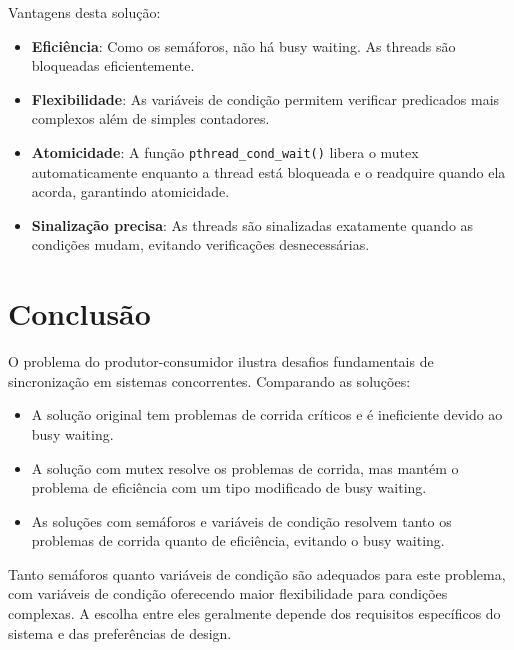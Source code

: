 \documentclass[12pt]{article}
\begin{document}
Vantagens desta solução:
\begin{itemize}
    \item \textbf{Eficiência}: Como os semáforos, não há busy waiting. As threads são bloqueadas eficientemente.
    \item \textbf{Flexibilidade}: As variáveis de condição permitem verificar predicados mais complexos além de simples contadores.
    \item \textbf{Atomicidade}: A função \texttt{pthread\_cond\_wait()} libera o mutex automaticamente enquanto a thread está bloqueada e o readquire quando ela acorda, garantindo atomicidade.
    \item \textbf{Sinalização precisa}: As threads são sinalizadas exatamente quando as condições mudam, evitando verificações desnecessárias.
\end{itemize}

\section{Conclusão}

O problema do produtor-consumidor ilustra desafios fundamentais de sincronização em sistemas concorrentes. Comparando as soluções:

\begin{itemize}
    \item A solução original tem problemas de corrida críticos e é ineficiente devido ao busy waiting.
    \item A solução com mutex resolve os problemas de corrida, mas mantém o problema de eficiência com um tipo modificado de busy waiting.
    \item As soluções com semáforos e variáveis de condição resolvem tanto os problemas de corrida quanto de eficiência, evitando o busy waiting.
\end{itemize}

Tanto semáforos quanto variáveis de condição são adequados para este problema, com variáveis de condição oferecendo maior flexibilidade para condições complexas. A escolha entre eles geralmente depende dos requisitos específicos do sistema e das preferências de design.
\end{document}
